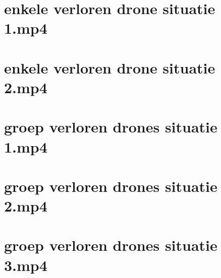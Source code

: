 \documentclass[a4paper, 11pt, oneside]{report}
\begin{document}
\section{enkele verloren drone situatie 1.mp4}\label{sec:enkele-verloren-drone-situatie-1mp4}
\section{enkele verloren drone situatie 2.mp4}\label{sec:enkele-verloren-drone-situatie-2mp4}
\section{groep verloren drones situatie 1.mp4}\label{sec:groep-verloren-drones-situatie-1mp4}
\section{groep verloren drones situatie 2.mp4}\label{sec:groep-verloren-drones-situatie-2mp4}
\section{groep verloren drones situatie 3.mp4}\label{sec:groep-verloren-drones-situatie-3mp4}
\end{document}
